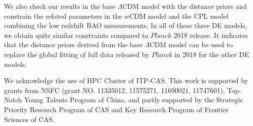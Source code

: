 \documentclass[floatfix,aps,amsmath,nofootinbib,onecolumn,10pt]{revtex4}
\begin{document}
We also check our results in the base $\Lambda$CDM model with the distance priors and constrain the related parameters in the $w$CDM model and the CPL model combining the low redshift BAO measurements. 
In all of these three DE models, we obtain quite similar constraints compared to $Planck$ 2018 release. 
It indicates that the distance priors derived from the base $\Lambda$CDM model can be used to replace the global fitting of full data released by $Planck$ in 2018 for the other DE models.


\vspace{5mm}

We acknowledge the use of HPC Cluster of ITP-CAS. This work is supported by grants from NSFC (grant NO. 11335012, 11575271, 11690021, 11747601), Top-Notch Young Talents Program of China, and partly supported by the Strategic Priority Research Program of CAS and Key Research Program of Frontier Sciences of CAS.


\newpage
\end{document}

